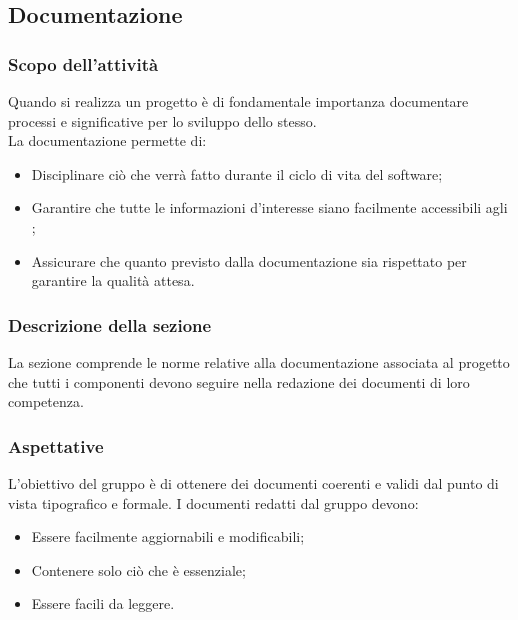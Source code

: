 \subsection{Documentazione}
\subsubsection{Scopo dell'attività} \label{PSup_Documentazione_Scopo}
Quando si realizza un progetto è di fondamentale importanza documentare processi e  significative per lo sviluppo dello stesso.\\
La documentazione permette di:
\begin{itemize}
	\item Disciplinare ciò che verrà fatto durante il ciclo di vita del software;
	\item Garantire che tutte le informazioni d'interesse siano facilmente accessibili agli ;
	\item Assicurare che quanto previsto dalla documentazione sia rispettato per garantire la qualità attesa.
\end{itemize}

\subsubsection{Descrizione della sezione} 
La sezione comprende le norme relative alla documentazione associata al progetto che tutti i componenti devono seguire nella redazione dei documenti di loro competenza.

\subsubsection{Aspettative}
L'obiettivo del gruppo è di ottenere dei documenti coerenti e validi dal punto di vista tipografico e formale.
I documenti redatti dal gruppo devono:
\begin{itemize}
	\item Essere facilmente aggiornabili e modificabili;
	\item Contenere solo ciò che è essenziale;
	\item Essere facili da leggere.
\end{itemize}

